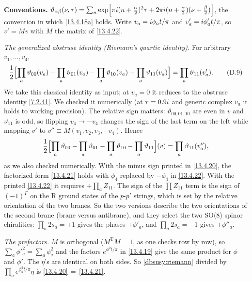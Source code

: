 \begin{tcolorbox}[breakable]
	\begin{remark}
		\textbf{Conventions.} $\vartheta_{\alpha\beta}(\nu,\tau)=\sum_n\exp[\pi i(n+\frac\alpha2)^2\tau+2\pi i(n+\frac\alpha2)(\nu+\frac\beta2)]$, the convention in which \eqref{13.4.18a} holds. Write $v_a=i\phi_at/\pi$ and $v'_a=i\phi'_at/\pi$, so $v'=Mv$ with $M$ the matrix of \eqref{13.4.22}.

		\textit{The generalized abstruse identity (Riemann's quartic identity).} For arbitrary $v_1,\dots,v_4$,
		\begin{equation}
			\frac12\Bigl[\prod_a\vartheta_{00}(v_a)-\prod_a\vartheta_{01}(v_a)-\prod_a\vartheta_{10}(v_a)+\prod_a\vartheta_{11}(v_a)\Bigr] = \prod_a\vartheta_{11}(v'_a) . \tag{D.9}\label{dbsusy:riemann}
		\end{equation}
		We take this classical identity as input; at $v_a=0$ it reduces to the abstruse identity \eqref{7.2.41}. We checked it numerically (at $\tau=0.9i$ and generic complex $v_a$ it holds to working precision). The relative sign matters: $\vartheta_{00,01,10}$ are even in $v$ and $\vartheta_{11}$ is odd, so flipping $v_4\to-v_4$ changes the sign of the last term on the left while mapping $v'$ to $v''\equiv M(v_1,v_2,v_3,-v_4)$. Hence
		\begin{equation*}
			\frac12\Bigl[\prod_a\vartheta_{00}-\prod_a\vartheta_{01}-\prod_a\vartheta_{10}-\prod_a\vartheta_{11}\Bigr](v) = \prod_a\vartheta_{11}(v''_a),
		\end{equation*}
		as we also checked numerically. With the minus sign printed in \eqref{13.4.20}, the factorized form \eqref{13.4.21} holds with $\phi_4$ replaced by $-\phi_4$ in \eqref{13.4.22}. With the printed \eqref{13.4.22} it requires $+\prod_aZ_{11}$. The sign of the $\prod Z_{11}$ term is the sign of $(-1)^F$ on the R ground states of the $p$-$p'$ strings, which is set by the relative orientation of the two branes. So the two versions describe the two orientations of the second brane (brane versus antibrane), and they select the two SO(8) spinor chiralities: $\prod_a2s_a=+1$ gives the phases $\pm\phi'_a$, and $\prod_a2s_a=-1$ gives $\pm\phi''_a$.

		\textit{The prefactors.} $M$ is orthogonal ($M^{\mathrm T}M=1$, as one checks row by row), so $\sum_a\phi'^2_a=\sum_a\phi_a^2$ and the factors $e^{\phi^2t/\pi}$ in \eqref{13.4.19} give the same product for $\phi$ and $\phi'$. The $\eta$'s are identical on both sides. So \eqref{dbsusy:riemann} divided by $\prod_ae^{\phi_a^2t/\pi}\eta$ is \eqref{13.4.20}$\,=\,$\eqref{13.4.21}.


\end{remark}
\end{tcolorbox}

